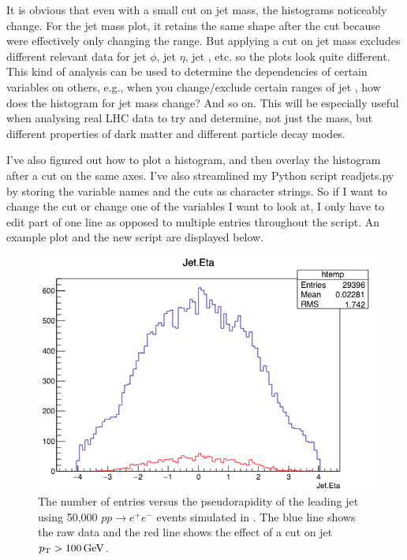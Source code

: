 It is obvious that even with a small cut on jet mass, the histograms noticeably change. For the jet mass plot, it retains the same shape after the cut because were effectively only changing the range. But applying a cut on jet mass excludes different relevant data for jet $\phi$, jet $\eta$, jet \pt, etc. so the plots look quite different. This kind of analysis can be used to determine the dependencies of certain variables on others, e.g., when you change/exclude certain ranges of jet \pt, how does the histogram for jet mass change? And so on. This will be especially useful when analysing real LHC data to try and determine, not just the mass, but different properties of dark matter and different particle decay modes.

I've also figured out how to plot a histogram, and then overlay the histogram after a cut on the same axes. I've also streamlined my Python script readjets.py by storing the variable names and the cuts as character strings. So if I want to change the cut or change one of the variables I want to look at, I only have to edit part of one line as opposed to multiple entries throughout the script. An example plot and the new script are displayed below.

\begin{figure}[H]
\centering
\includegraphics[width=\textwidth]{./sec10/JetEtalargecut.png}
\caption{The number of entries versus the pseudorapidity of the leading jet using 50,000 $pp \rightarrow e^+ e^-$ events simulated in \madgraph. The blue line shows the raw data and the red line shows the effect of a cut on jet $p_{\mathrm{T}} > 100\,\text{G\text{e\kern-0.15ex V}}$.}
\end{figure}


